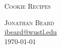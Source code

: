 \documentclass[pdftex,10pt, letterpaper, notitlepage]{article}
\begin{document}
\begin{center}
\begin{minipage}{.5\textwidth}
\begin{flushleft}
\textsc{Cookie Recipes}
\end{flushleft}
\end{minipage}
\begin{minipage}{.4\textwidth}
\begin{flushright}
\textsc{Jonathan Beard\\}
\href{mailto:jbeard@wustl.edu}{jbeard@wustl.edu}\\
\today
\end{flushright}
\end{minipage}

\end{center}
\hrulefill

\end{document}
